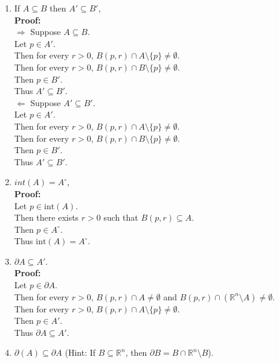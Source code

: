 \documentclass{article}
\begin{document}
\begin{enumerate}
\begin{enumerate}
    
    \item If $A \subseteq B$ then $A' \subseteq B'$,\\ 
    
\textbf{Proof:} \\
$\Rightarrow$ Suppose $A \subseteq B$. \\
Let $p \in A'$. \\
Then for every $r > 0$, $B(p,r) \cap A \setminus \{p\} \neq \emptyset$. \\
Then for every $r > 0$, $B(p,r) \cap B \setminus \{p\} \neq \emptyset$. \\
Then $p \in B'$. \\
Thus $A' \subseteq B'$.\\
$\Leftarrow$ Suppose $A' \subseteq B'$. \\
Let $p \in A'$. \\
Then for every $r > 0$, $B(p,r) \cap A \setminus \{p\} \neq \emptyset$. \\
Then for every $r > 0$, $B(p,r) \cap B \setminus \{p\} \neq \emptyset$. \\
Then $p \in B'$. \\
Thus $A' \subseteq B'$.\\

    
    \item $int(A) = A^\circ$,\\
    
\textbf{Proof:} \\
Let $p \in \text{int}(A)$. \\
Then there exists $r > 0$ such that $B(p,r) \subseteq A$. \\
Then $p \in A^\circ$. \\
Thus $\text{int}(A) = A^\circ$.\\

    
    \item $\partial A \subseteq A'$.\\
    
\textbf{Proof:} \\
Let $p \in \partial A$. \\
Then for every $r > 0$, $B(p,r) \cap A \neq \emptyset$ and $B(p,r) \cap (\mathbb{R}^n \setminus A) \neq \emptyset$. \\
Then for every $r > 0$, $B(p,r) \cap A \setminus \{p\} \neq \emptyset$. \\
Then $p \in A'$. \\
Thus $\partial A \subseteq A'$.\\

    
    \item $\partial(A) \subseteq \partial A$ (Hint: If $B \subseteq \mathbb{R}^n$, then $\partial B = B \cap \mathbb{R}^n \setminus B$).\\
    

\end{enumerate}
\end{enumerate}
\end{document}
